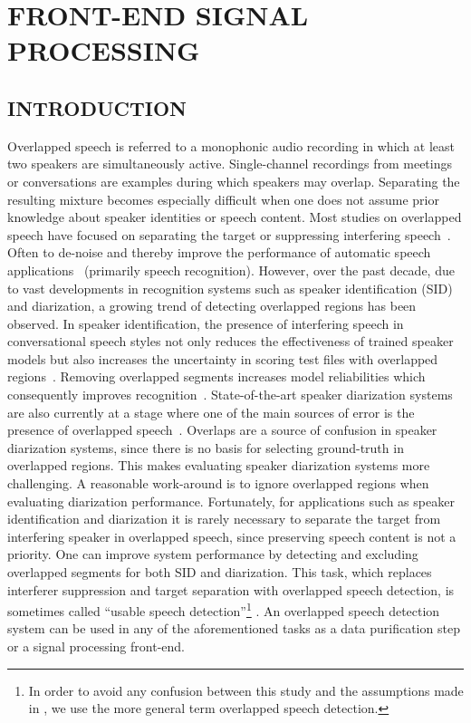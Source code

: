 
\chapter{FRONT-END SIGNAL PROCESSING}

\section{INTRODUCTION}
\label{sec:intro}

Overlapped speech is referred to a monophonic audio recording in which at least two speakers are simultaneously active. 
Single-channel recordings from meetings or conversations are examples during which speakers may overlap.
Separating the resulting mixture becomes especially difficult when one does not assume prior knowledge about speaker identities or speech content. 
Most studies on overlapped speech have focused on separating the target or suppressing interfering speech~\cite{morgan_cochannel}. 
Often to de-noise and thereby improve the performance of automatic speech applications~\cite{Quat_Dan_cch_sup,Chazan_93,cooke20101} (primarily speech recognition). 
However, over the past decade, due to vast developments in recognition systems such as speaker identification (SID) and diarization, a growing trend of detecting overlapped regions has been observed. 
In speaker identification, the presence of interfering speech in conversational speech styles not only reduces the effectiveness of trained speaker models but also increases the uncertainty in scoring test files with overlapped regions~\cite{yantorno_report}. 
Removing overlapped segments increases model reliabilities which consequently improves recognition~\cite{shokouhi2015}.    
State-of-the-art speaker diarization systems are also currently at a stage where one of the main sources of error is the presence of overlapped speech~\cite{boakye_icassp_08,zelenak12Trans}. 
Overlaps are a source of confusion in speaker diarization systems, since there is no basis for selecting ground-truth in overlapped regions. 
This makes evaluating speaker diarization systems more challenging. 
A reasonable work-around is to ignore overlapped regions when evaluating diarization performance. 
Fortunately, for applications such as speaker identification and diarization it is rarely necessary to separate the target from interfering speaker in overlapped speech, since preserving speech content is not a priority. 
One can improve system performance by detecting and excluding overlapped segments for both SID and diarization. 
This task, which replaces interferer suppression and target separation with overlapped speech detection, is sometimes called ``usable speech detection''\footnote{In order to avoid any confusion between this study and the assumptions made in \cite{yantorno_report}, we use the more general term overlapped speech detection.} \cite{yantorno_report}. 
An overlapped speech detection system can be used in any of the aforementioned tasks as a data purification step or a signal processing front-end. 

